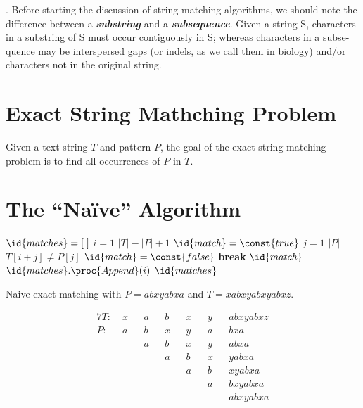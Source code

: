 . Before starting the discussion of string matching algorithms, we should note the difference between a \textit{\textbf{substring}} and a \textit{\textbf{subsequence}}. Given a string S, characters in a substring of S must occur contiguously in S; whereas characters in a subse- quence may be interspersed gaps (or indels, as we call them in biology) and/or characters not in the original string.

\section{Exact String Mathching Problem}

Given a text string $T$ and pattern $P$, the goal of the exact string matching problem is to find all occurrences of $P$ in $T$.

\section{The ``Na\"ive'' Algorithm}

\begin{codebox}
    \li $\id{matches} = [\;]$
    \li \For $i=1$ \To $|T|-|P|+1$ \Do
        \li $\id{match} = \const{true}$
        \li \For $j = 1$ \To $|P|$ \Do
            \li \If $T[i+j] \neq P[j]$ \Then
                \li $\id{match} = \const{false}$
                \li \textbf{break}
            \End
        \li \If $\id{match}$ \Then
            \li $\id{matches}.\proc{Append}(i)$ 
        \End
    \End
    \li \Return $\id{matches}$ 
\end{codebox}

\begin{marginfigure}
    \caption{Naive exact matching with $P=abxyabxa$ and $T=xabxyabxyabxz$.}
    \begin{alignat*}{7}
        T:\; &x&&a&&b&&x&&y&&abxyabxz \\
        P:\; &a&&b&&x&&y&&a&&bxa \\
        & && a&&b&&x&&y&&abxa \\
        & && && a&&b&&x&&yabxa \\
        & && && && a&&b&&xyabxa \\
        & && && && && a &&bxyabxa \\
        & && && && && && abxyabxa \\
    \end{alignat*}
    \label{fig:naive-matching}
\end{marginfigure}

